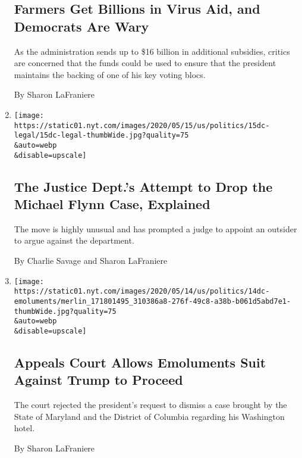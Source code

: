 \begin{enumerate}
  \hypertarget{farmers-get-billions-in-virus-aid-and-democrats-are-wary}{%
  \subsection{Farmers Get Billions in Virus Aid, and Democrats Are
  Wary}\label{farmers-get-billions-in-virus-aid-and-democrats-are-wary}}

  As the administration sends up to \$16 billion in additional
  subsidies, critics are concerned that the funds could be used to
  ensure that the president maintains the backing of one of his key
  voting blocs.

  By Sharon LaFraniere
\item
  \href{/2020/05/15/us/politics/michael-flynn-case-explained.html}{}

  \texttt{[image: https://static01.nyt.com/images/2020/05/15/us/politics/15dc-legal/15dc-legal-thumbWide.jpg?quality=75\\\&auto=webp\\\&disable=upscale]}

  \hypertarget{the-justice-depts-attempt-to-drop-the-michael-flynn-case-explained}{%
  \subsection{The Justice Dept.'s Attempt to Drop the Michael Flynn
  Case,
  Explained}\label{the-justice-depts-attempt-to-drop-the-michael-flynn-case-explained}}

  The move is highly unusual and has prompted a judge to appoint an
  outsider to argue against the department.

  By Charlie Savage and Sharon LaFraniere
\item
  \href{/2020/05/14/us/politics/trump-emoluments-clause-fourth-circuit.html}{}

  \texttt{[image: https://static01.nyt.com/images/2020/05/14/us/politics/14dc-emoluments/merlin\_171801495\_310386a8-276f-49c8-a38b-b061d5abd7e1-thumbWide.jpg?quality=75\\\&auto=webp\\\&disable=upscale]}

  \hypertarget{appeals-court-allows-emoluments-suit-against-trump-to-proceed}{%
  \subsection{Appeals Court Allows Emoluments Suit Against Trump to
  Proceed}\label{appeals-court-allows-emoluments-suit-against-trump-to-proceed}}

  The court rejected the president's request to dismiss a case brought
  by the State of Maryland and the District of Columbia regarding his
  Washington hotel.

  By Sharon LaFraniere
\end{enumerate}

